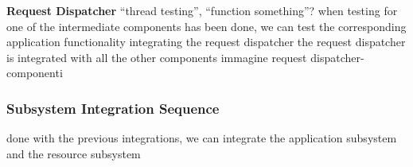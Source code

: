 \documentclass[english]{article}
\begin{document}
\begin{figure}[H]
	\centering
\end{figure}
\begin{figure}[H]
	\centering
\end{figure}\begin{figure}[H]
\centering
{}
\end{figure}\begin{figure}[H]
\centering
{}
\end{figure}\begin{figure}[H]
\centering
{}
\end{figure}

\textbf{Request Dispatcher}
“thread testing”, “function something”?
when testing for one of the intermediate components has been done, we can test the corresponding application functionality integrating the request dispatcher
the request dispatcher is integrated with all the other components
immagine request dispatcher-componenti

\subsubsection{Subsystem Integration Sequence}
done with the previous integrations, we can integrate the application subsystem and the resource subsystem
\end{document}
